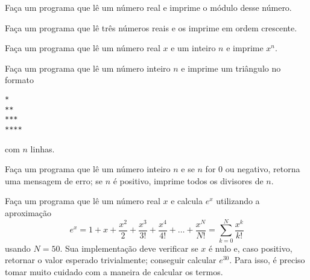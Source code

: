 \begin{Exercise}[label={0005}, difficulty={1}, origin={if}]
  Faça um programa que lê um número real e imprime o módulo
  desse número.
\end{Exercise}

\begin{Exercise}[label={0006}, difficulty={1}, origin={if}]
  Faça um programa que lê três números reais e os imprime em
  ordem crescente.
\end{Exercise}

\begin{Exercise}[label={0007}, difficulty={1}, origin={for}]
  Faça um programa que lê um número real $x$ e um inteiro $n$ e imprime
  $x^n$.
\end{Exercise}

\begin{Exercise}[label={0008}, difficulty={1}, origin={for}]
  Faça um programa que lê um número inteiro $n$ e imprime um triângulo
  no formato
\begin{lstlisting}
*
**
***
****
\end{lstlisting}
  com $n$ linhas.
\end{Exercise}

\begin{Exercise}[label={0009}, difficulty={2}, origin={for}]
  Faça um programa que lê um número inteiro $n$ e
  \Question se $n$ for 0 ou negativo, retorna uma mensagem de erro;
  \Question se $n$ é positivo, imprime todos os divisores de $n$.
\end{Exercise}

\begin{Exercise}[label={0010}, difficulty={3}, origin={for}]
  Faça um programa que lê um número real $x$ e  calcula $e^x$ 
  utilizando a aproximação
  $$ e^x = 1 + x + \frac{x^2}{2} + \frac{x^3}{3!} + \frac{x^4}{4!} +
  \dots + \frac{x^N}{N!} = \sum_{k=0}^N\frac{x^k}{k!} $$
  usando $N = 50$. Sua implementação deve
  \Question verificar se $x$ é nulo e, caso positivo, retornar o
    valor esperado trivialmente;
  \Question conseguir calcular $e^{30}$. Para isso, é preciso
    tomar muito cuidado com a maneira de calcular os termos.
\end{Exercise}
